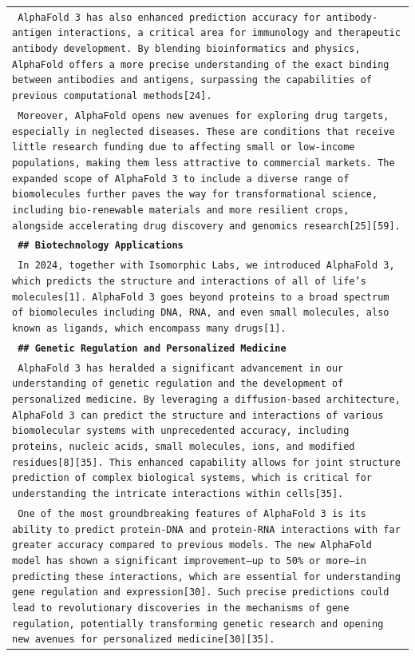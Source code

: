 \begin{longtable}{p{\textwidth}}
\texttt{\small{ AlphaFold 3 has also enhanced prediction accuracy for antibody-antigen interactions, a critical area for immunology and therapeutic antibody development. By blending bioinformatics and physics, AlphaFold offers a more precise understanding of the exact binding between antibodies and antigens, surpassing the capabilities of previous computational methods[24]. }} \\
\texttt{\small{ Moreover, AlphaFold opens new avenues for exploring drug targets, especially in neglected diseases. These are conditions that receive little research funding due to affecting small or low-income populations, making them less attractive to commercial markets. The expanded scope of AlphaFold 3 to include a diverse range of biomolecules further paves the way for transformational science, including bio-renewable materials and more resilient crops, alongside accelerating drug discovery and genomics research[25][59]. }} \\
\vspace{1pt}
\texttt{\small{\textbf{ \#\# Biotechnology Applications }}} \\
\texttt{\small{ In 2024, together with Isomorphic Labs, we introduced AlphaFold 3, which predicts the structure and interactions of all of life’s molecules[1]. AlphaFold 3 goes beyond proteins to a broad spectrum of biomolecules including DNA, RNA, and even small molecules, also known as ligands, which encompass many drugs[1]. }} \\
\vspace{1pt}
\texttt{\small{\textbf{ \#\# Genetic Regulation and Personalized Medicine }}} \\
\texttt{\small{ AlphaFold 3 has heralded a significant advancement in our understanding of genetic regulation and the development of personalized medicine. By leveraging a diffusion-based architecture, AlphaFold 3 can predict the structure and interactions of various biomolecular systems with unprecedented accuracy, including proteins, nucleic acids, small molecules, ions, and modified residues[8][35]. This enhanced capability allows for joint structure prediction of complex biological systems, which is critical for understanding the intricate interactions within cells[35]. }} \\
\texttt{\small{ One of the most groundbreaking features of AlphaFold 3 is its ability to predict protein-DNA and protein-RNA interactions with far greater accuracy compared to previous models. The new AlphaFold model has shown a significant improvement—up to 50\% or more—in predicting these interactions, which are essential for understanding gene regulation and expression[30]. Such precise predictions could lead to revolutionary discoveries in the mechanisms of gene regulation, potentially transforming genetic research and opening new avenues for personalized medicine[30][35]. }} \\

\end{longtable}
